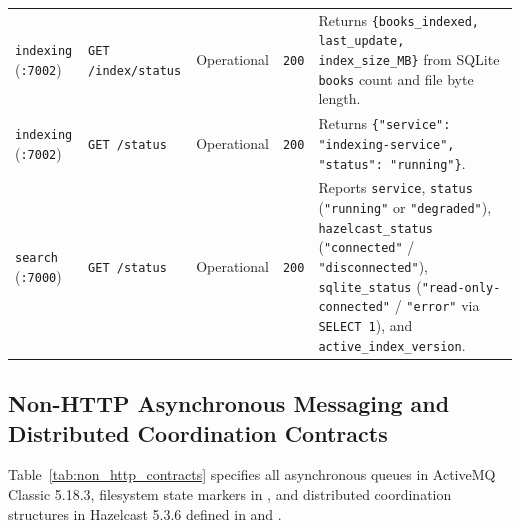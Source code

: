 \documentclass[10pt,a4paper]{article}
\begin{document}
\begin{table}[!htbp]
\begin{tabularx}{\textwidth}{L{2.1cm} L{3.2cm} L{1.5cm} L{1.8cm} Y}
\texttt{indexing} (\texttt{:7002}) & \texttt{GET /index/status} & Operational & \texttt{200} & Returns \texttt{\{books\_indexed, last\_update, index\_size\_MB\}} from SQLite \texttt{books} count and file byte length. \\
\texttt{indexing} (\texttt{:7002}) & \texttt{GET /status} & Operational & \texttt{200} & Returns \texttt{\{"service": "indexing-service", "status": "running"\}}. \\
\midrule
\texttt{search} (\texttt{:7000}) & \texttt{GET /status} & Operational & \texttt{200} & Reports \texttt{service}, \texttt{status} (\texttt{"running"} or \texttt{"degraded"}), \texttt{hazelcast\_status} (\texttt{"connected"} / \texttt{"disconnected"}), \texttt{sqlite\_status} (\texttt{"read-only-connected"} / \texttt{"error"} via \texttt{SELECT 1}), and \texttt{active\_index\_version}. \\
\bottomrule
\end{tabularx}
\end{table}

\subsection{Non-HTTP Asynchronous Messaging and Distributed Coordination Contracts}
Table~\ref{tab:non_http_contracts} specifies all asynchronous queues in ActiveMQ Classic 5.18.3, filesystem state markers in , and distributed coordination structures in Hazelcast 5.3.6 defined in  and .
\end{document}
